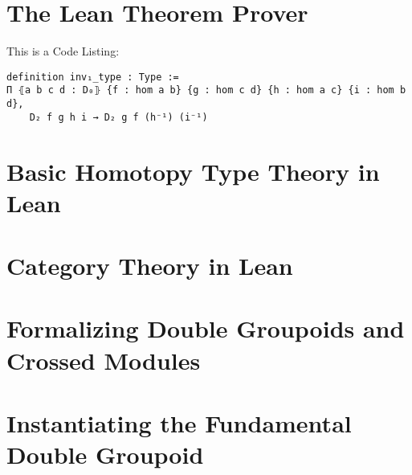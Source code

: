 \section{The Lean Theorem Prover}


This is a Code Listing:
\begin{verbatim}
definition inv₁_type : Type :=
Π ⦃a b c d : D₀⦄ {f : hom a b} {g : hom c d} {h : hom a c} {i : hom b d},
    D₂ f g h i → D₂ g f (h⁻¹) (i⁻¹)
\end{verbatim}

\section{Basic Homotopy Type Theory in Lean}

\section{Category Theory in Lean}

\section{Formalizing Double Groupoids and Crossed Modules}

\section{Instantiating the Fundamental Double Groupoid}
